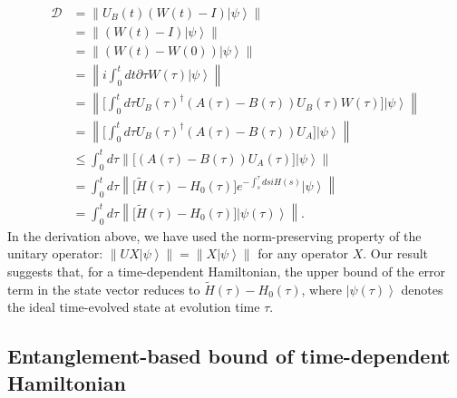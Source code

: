 \documentclass[12pt]{article}
\newcommand{\ket}[1]{\left|#1\right\rangle}
\newcommand{\norm}[1]{\left\lVert #1\right\rVert}
\begin{document}
\begin{equation}
\begin{split}
\mathcal{D}
        &=\norm{U_B(t)( W(t)-I)\ket{\psi}}\\
       &=\norm{( W(t)-I)\ket{\psi}}\\
       &=\norm{( W(t)- W(0))\ket{\psi}}\\
        &=\norm{i\int^t_0 dt  \partial \tau W(\tau)\ket{\psi}}\\
        &= \norm{\big[\int_0 ^t d\tau U_B (\tau)^\dagger (A(\tau)-B(\tau))U_B(\tau) W(\tau) \big]\ket{\psi}}\\
           &= \norm{\big[\int_0 ^t d\tau U_B (\tau)^\dagger (A(\tau)-B(\tau))U_A \big]\ket{\psi}}\\
        &\le \int_0 ^t d\tau\norm{\big[  (A(\tau)-B(\tau))U_A(\tau)\big]\ket{\psi}}\\
        &=\int_0 ^t d\tau \norm{\big[  \widetilde{H}(\tau)-H_0(\tau)\big]e^{-\int_s^{\tau} d siH(s)}\ket{\psi}}\\
        &=\int_0 ^t d\tau \norm{\big[  \widetilde{H}(\tau)-H_0(\tau)\big]\ket{\psi(\tau)}}.
        \end{split}
\end{equation}
In the derivation above, we have used the norm-preserving property of the unitary operator: $\|U X\ket{\psi}\| = \|X\ket{\psi}\|$ for any operator $X$. Our result suggests that, for a time-dependent Hamiltonian, the upper bound of the error term in the state vector reduces to $\widetilde{H}(\tau) - H_0(\tau)$, where $\ket{\psi(\tau)}$ denotes the ideal time-evolved state at evolution time $\tau$.



\subsection*{Entanglement-based bound of time-dependent Hamiltonian}
\end{document}
